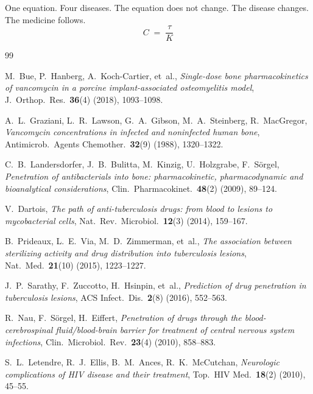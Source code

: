 \documentclass[11pt]{article}
\theoremstyle{plain}
\theoremstyle{definition}
\begin{document}
One equation. Four diseases. The equation does not change. The
disease changes. The medicine follows.
\begin{equation*}
  C \;=\; \frac{\tau}{K}
\end{equation*}


\begin{thebibliography}{99}

M.~Bue, P.~Hanberg, A.~Koch-Cartier, et~al.,
\textit{Single-dose bone pharmacokinetics of vancomycin in a porcine
implant-associated osteomyelitis model},
J.~Orthop.\ Res.\ \textbf{36}(4) (2018), 1093--1098.

A.~L.~Graziani, L.~R.~Lawson, G.~A.~Gibson, M.~A.~Steinberg,
R.~MacGregor,
\textit{Vancomycin concentrations in infected and noninfected human bone},
Antimicrob.\ Agents Chemother.\ \textbf{32}(9) (1988), 1320--1322.

C.~B.~Landersdorfer, J.~B.~Bulitta, M.~Kinzig, U.~Holzgrabe, F.~S{\"o}rgel,
\textit{Penetration of antibacterials into bone: pharmacokinetic,
pharmacodynamic and bioanalytical considerations},
Clin.\ Pharmacokinet.\ \textbf{48}(2) (2009), 89--124.

V.~Dartois,
\textit{The path of anti-tuberculosis drugs: from blood to lesions to
mycobacterial cells},
Nat.\ Rev.\ Microbiol.\ \textbf{12}(3) (2014), 159--167.

B.~Prideaux, L.~E.~Via, M.~D.~Zimmerman, et~al.,
\textit{The association between sterilizing activity and drug distribution
into tuberculosis lesions},
Nat.\ Med.\ \textbf{21}(10) (2015), 1223--1227.

J.~P.~Sarathy, F.~Zuccotto, H.~Hsinpin, et~al.,
\textit{Prediction of drug penetration in tuberculosis lesions},
ACS Infect.\ Dis.\ \textbf{2}(8) (2016), 552--563.

R.~Nau, F.~S{\"o}rgel, H.~Eiffert,
\textit{Penetration of drugs through the blood-cerebrospinal
fluid/blood-brain barrier for treatment of central nervous system infections},
Clin.\ Microbiol.\ Rev.\ \textbf{23}(4) (2010), 858--883.

S.~L.~Letendre, R.~J.~Ellis, B.~M.~Ances, R.~K.~McCutchan,
\textit{Neurologic complications of HIV disease and their treatment},
Top.\ HIV Med.\ \textbf{18}(2) (2010), 45--55.


\end{thebibliography}
\end{document}
